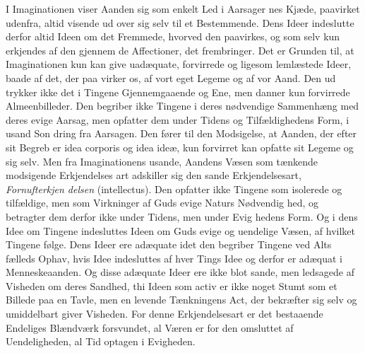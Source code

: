 \documentclass[12pt,a4paper]{book}
\begin{document}
I Imaginationen viser Aanden sig som enkelt Led i Aarsager\-%
nes Kjæde, paavirket udenfra, altid visende ud over sig selv
til et Bestemmende. Dens Ideer indeslutte derfor altid Ideen
om det Fremmede, hvorved den paavirkes, og som selv kun
erkjendes af den gjennem de Affectioner, det frembringer. Det
er Grunden til, at Imaginationen kun kan give uadæquate,
forvirrede og ligesom lemlæstede Ideer, baade af det, der paa\-%
virker os, af vort eget Legeme og af vor Aand. Den ud\-%
trykker ikke det i Tingene Gjennemgaaende og Ene, men
danner kun forvirrede Almeenbilleder. Den begriber ikke Tingene
i deres nødvendige Sammenhæng med deres evige Aarsag, men
opfatter dem under Tidens og Tilfældighedens Form, i usand Son\-%
dring fra Aarsagen. Den fører til den Modsigelse, at Aanden,
der efter sit Begreb er idea corporis og idea ideæ, kun forvirret
kan opfatte sit Legeme og sig selv. Men fra Imaginationens
usande, Aandens Væsen som tænkende modsigende Erkjendelses\-%
art adskiller sig den sande Erkjendelsesart, \emph{Fornufterkjen\-%
delsen} (intellectus). Den opfatter ikke Tingene som isolerede og
tilfældige, men som Virkninger af Guds evige Naturs Nødvendig\-%
hed, og betragter dem derfor ikke under Tidens, men under Evig\-%
hedens Form. Og i dens Idee om Tingene indesluttes Ideen om
Guds evige og uendelige Væsen, af hvilket Tingene følge.
Dens Ideer ere adæquate idet den begriber Tingene ved Alts
fælleds Ophav, hvis Idee indesluttes af hver Tings Idee og
derfor er adæquat i Menneskeaanden. Og disse adæquate
Ideer ere ikke blot sande, men ledsagede af Visheden om
deres Sandhed, thi Ideen som activ er ikke noget Stumt som
et Billede paa en Tavle, men en levende Tænkningens Act,
der bekræfter sig selv og umiddelbart giver Visheden. For
denne Erkjendelsesart er det bestaaende Endeliges Blændværk
forsvundet, al Væren er for den omsluttet af Uendeligheden,
al Tid optagen i Evigheden.
\end{document}
